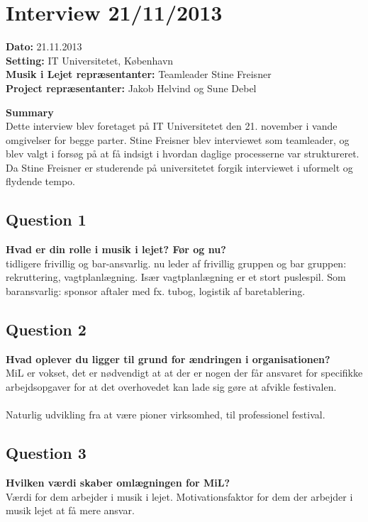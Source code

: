 \section{Interview 21/11/2013}
\label{interview_4}

\textbf{Dato:} 21.11.2013 \\
\textbf{Setting:} IT Universitetet, København \\
\textbf{Musik i Lejet repræsentanter:} Teamleader Stine Freisner \\
\textbf{Project repræsentanter:} Jakob Helvind og Sune Debel

\bigskip

\noindent \textbf{Summary} \\
Dette interview blev foretaget på IT Universitetet den 21. november i vande omgivelser for begge parter. Stine Freisner blev interviewet som teamleader, og blev valgt i forsøg på at få indsigt i hvordan daglige processerne var struktureret. Da Stine Freisner er studerende på universitetet forgik interviewet i uformelt og flydende tempo.

\subsection{Question 1}
\label{i4q1}
\noindent \textbf{Hvad er din rolle i musik i lejet? Før og nu?} \\
tidligere frivillig og bar-ansvarlig. nu leder af frivillig gruppen og bar gruppen: rekruttering, vagtplanlægning. Især vagtplanlægning er et stort puslespil. Som baransvarlig: sponsor aftaler med fx. tubog, logistik af baretablering.

\subsection{Question 2}
\label{i4q2}
\noindent \textbf{Hvad oplever du ligger til grund for ændringen i organisationen?} \\
MiL er vokset, det er nødvendigt at at der er nogen der får ansvaret for specifikke arbejdsopgaver for at det overhovedet kan lade sig gøre at afvikle festivalen.
\\ \\
Naturlig udvikling fra at være pioner virksomhed, til professionel festival.

\subsection{Question 3}
\label{i4q3}
\noindent \textbf{Hvilken værdi skaber omlægningen for MiL?} \\
Værdi for dem arbejder i musik i lejet. Motivationsfaktor for dem der arbejder i musik lejet at få mere ansvar.

